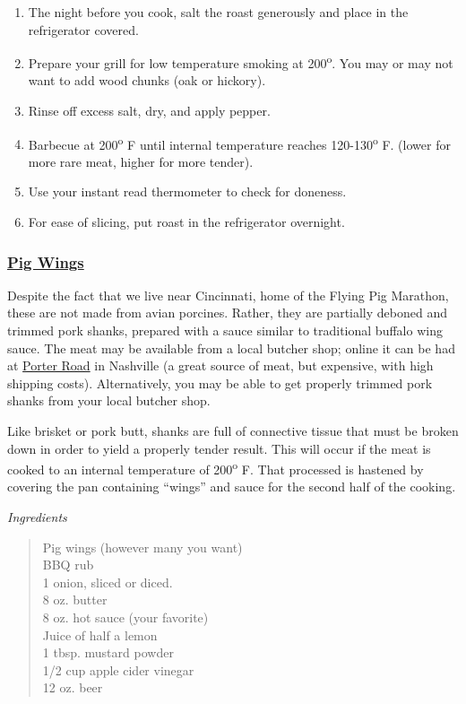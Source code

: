 \documentclass[
]{book}
\providecommand{\tightlist}{%
  \setlength{\itemsep}{0pt}\setlength{\parskip}{0pt}}
\begin{document}
\begin{enumerate}
\def\labelenumi{\arabic{enumi}.}
\tightlist
\item
  The night before you cook, salt the roast generously and place in the refrigerator covered.
\item
  Prepare your grill for low temperature smoking at 200\textsuperscript{o}. You may or may not want to add wood chunks (oak or hickory).
\item
  Rinse off excess salt, dry, and apply pepper.
\item
  Barbecue at 200\textsuperscript{o} F until internal temperature reaches 120-130\textsuperscript{o} F. (lower for more rare meat, higher for more tender).
\item
  Use your instant read thermometer to check for doneness.
\item
  For ease of slicing, put roast in the refrigerator overnight.
\end{enumerate}

\hypertarget{pig-wings}{%
\subsubsection{\texorpdfstring{\href{https://blog.thermoworks.com/bbq-grilling/pig-wings/}{Pig Wings}}{Pig Wings}}\label{pig-wings}}

Despite the fact that we live near Cincinnati, home of the Flying Pig Marathon, these are not made from avian porcines. Rather, they are partially deboned and trimmed pork shanks, prepared with a sauce similar to traditional buffalo wing sauce. The meat may be available from a local butcher shop; online it can be had at \href{https://porterroad.com/}{Porter Road} in Nashville (a great source of meat, but expensive, with high shipping costs). Alternatively, you may be able to get properly trimmed pork shanks from your local butcher shop.

Like brisket or pork butt, shanks are full of connective tissue that must be broken down in order to yield a properly tender result. This will occur if the meat is cooked to an internal temperature of 200\textsuperscript{o} F. That processed is hastened by covering the pan containing ``wings'' and sauce for the second half of the cooking.

\emph{Ingredients}

\begin{quote}
Pig wings (however many you want)\\
BBQ rub\\
1 onion, sliced or diced.\\
8 oz. butter\\
8 oz. hot sauce (your favorite)\\
Juice of half a lemon\\
1 tbsp. mustard powder\\
1/2 cup apple cider vinegar\\
12 oz. beer
\end{quote}
\end{document}
